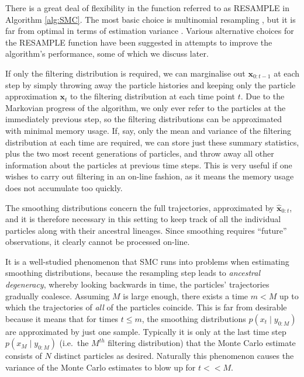 \documentclass{article}
\begin{document}
There is a great deal of flexibility in the function referred to as {\footnotesize RESAMPLE} in Algorithm \ref{alg:SMC}. The most basic choice is multinomial resampling \citep{efron1994}, but it is far from optimal in terms of estimation variance \citep{douc2005}. Various alternative choices for the {\footnotesize RESAMPLE} function have been suggested in attempts to improve the algorithm's performance, some of which we discuss later.

If only the filtering distribution is required, we can marginalise out $\mathbf{x}_{0:t-1}$ at each step by simply throwing away the particle histories and keeping only the particle approximation $\mathbf{x}_{t}$ to the filtering distribution at each time point $t$. Due to the Markovian progress of the algorithm, we only ever refer to the particles at the immediately previous step, so the filtering distributions can be approximated with minimal memory usage. If, say, only the mean and variance of the filtering distribution at each time are required, we can store just these summary statistics, plus the two most recent generations of particles, and throw away all other information about the particles at previous time steps. This is very useful if one wishes to carry out filtering in an on-line fashion, as it means the memory usage does not accumulate too quickly.

The smoothing distributions concern the full trajectories, approximated by $\hat{\mathbf{x}}_{0:t}$, and it is therefore necessary in this setting to keep track of all the individual particles along with their ancestral lineages. Since smoothing requires ``future'' observations, it clearly cannot be processed on-line.

It is a well-studied phenomenon that SMC runs into problems when estimating smoothing distributions, because the resampling step leads to \emph{ancestral degeneracy}, whereby looking backwards in time, the particles' trajectories gradually coalesce. Assuming $M$ is large enough, there exists a time $m<M$  up to which the trajectories of \emph{all} of the particles coincide. 
This is far from desirable because it means that for times $t\leq m$, the smoothing distributions $p(x_t \mid y_{0:M})$ are approximated by just one sample. Typically it is only at the last time step $p(x_M \mid y_{0:M})$ (i.e.\ the $M^{th}$ filtering distribution) that the Monte Carlo estimate consists of $N$ distinct particles as desired. Naturally this phenomenon causes the variance of the Monte Carlo estimates to blow up for $t<<M$.
\end{document}
